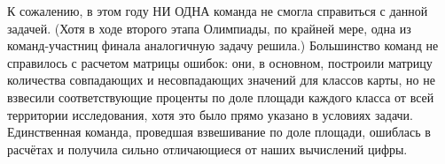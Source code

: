 К сожалению, в этом году НИ ОДНА команда не смогла справиться с данной задачей. (Хотя в ходе второго этапа Олимпиады, по крайней мере, одна из команд-участниц финала аналогичную задачу решила.) Большинство команд не справилось с расчетом матрицы ошибок: они, в основном, построили матрицу количества совпадающих и несовпадающих значений для классов карты, но не взвесили соответствующие проценты по доле площади каждого класса от всей территории исследования, хотя это было прямо указано в условиях задачи. Единственная команда, проведшая взвешивание по доле площади, ошиблась в расчётах и получила сильно отличающиеся от наших вычислений цифры.